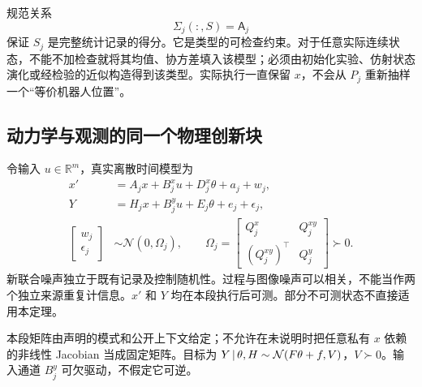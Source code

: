 \documentclass[UTF8,fontset=fandol,11pt,a4paper]{ctexart}
\newcommand{\R}{\mathbb R}\newcommand{\N}{\mathcal N}\newcommand{\E}{\mathbb E}
\theoremstyle{definition}\newtheorem{definition}[theorem]{定义}\newtheorem{assumption}[theorem]{条件}
\numberwithin{equation}{section}
\begin{document}
规范关系
\begin{equation}
\Sigma_j(:,S)=\mathsf A_j
\label{eq:scoreidentity}
\end{equation}
保证 $S_j$ 是完整统计记录的得分。它是类型的可检查约束。对于任意实际连续状态，不能不加检查就将其均值、协方差填入该模型；必须由初始化实验、仿射状态演化或经检验的近似构造得到该类型。实际执行一直保留 $x$，不会从 $P_j$ 重新抽样一个“等价机器人位置”。

\subsection{动力学与观测的同一个物理创新块}
令输入 $u\in\R^m$，真实离散时间模型为
\begin{align}
x'&=A_jx+B_j^xu+D_j^x\theta+a_j+w_j,\\
Y&=H_jx+B_j^yu+E_j\theta+e_j+\epsilon_j,
\label{eq:statephysical}\\
\begin{bmatrix}w_j\\\epsilon_j\end{bmatrix}
&\sim\N(0,\Omega_j),\qquad
\Omega_j=\begin{bmatrix}Q_j^x&Q_j^{xy}\\(Q_j^{xy})^\top&Q_j^y\end{bmatrix}\succ0.
\label{eq:jointnoise}
\end{align}
新联合噪声独立于既有记录及控制随机性。过程与图像噪声可以相关，不能当作两个独立来源重复计信息。$x'$ 和 $Y$ 均在本段执行后可测。部分不可测状态不直接适用本定理。

本段矩阵由声明的模式和公开上下文给定；不允许在未说明时把任意私有 $x$ 依赖的非线性 Jacobian 当成固定矩阵。目标为 $Y\given\theta,H\sim\N(F\theta+f,V)$，$V\succ0$。输入通道 $B_j^y$ 可欠驱动，不假定它可逆。
\end{document}
